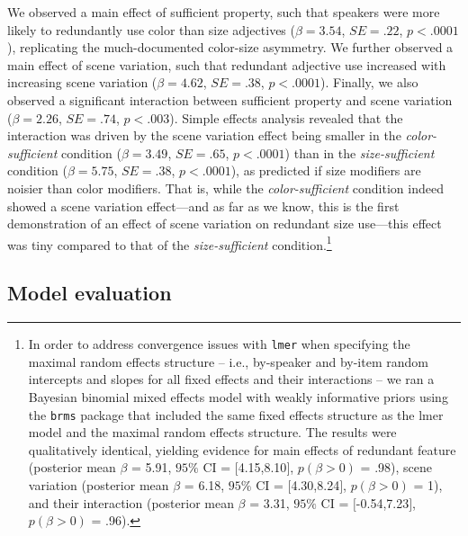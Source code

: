 \documentclass[11pt]{article}
\begin{document}
We observed a main effect of sufficient property, such that speakers were more likely to redundantly use color than size adjectives ($\beta = 3.54$, $SE = .22$, $p < .0001$), replicating the much-documented color-size asymmetry. We further observed a main effect of scene variation, such that redundant adjective use increased with increasing scene variation ($\beta = 4.62$, $SE = .38$, $p < .0001$). Finally, we also observed a significant interaction between sufficient property and scene variation ($\beta = 2.26$, $SE = .74$, $p < .003$). Simple effects analysis revealed that the interaction was driven by the scene variation effect being smaller in the \emph{color-sufficient} condition ($\beta = 3.49$, $SE = .65$, $p < .0001$) than in the \emph{size-sufficient} condition ($\beta = 5.75$, $SE = .38$, $p < .0001$), as predicted if size modifiers are noisier than color modifiers. That is, while the \emph{color-sufficient} condition indeed showed a scene variation effect---and as far as we know, this is the first demonstration of an effect of scene variation on redundant size use---this effect was tiny compared to that of the \emph{size-sufficient} condition.\footnote{In order to address convergence issues with \verb+lmer+ when specifying the maximal random effects structure -- i.e., by-speaker and by-item random intercepts and slopes for all fixed effects and their interactions -- we ran a Bayesian binomial mixed effects model with weakly informative priors using the \verb+brms+ package \cite{brms} that included the same fixed effects structure as the lmer model and the maximal random effects structure. The results were qualitatively identical, yielding  evidence for main effects of redundant feature (posterior mean $\beta$ = 5.91, $95\%$ CI = $[$4.15,8.10$]$, $p(\beta > 0)$ = .98), scene variation (posterior mean $\beta$ = 6.18, $95\%$ CI = $[$4.30,8.24$]$, $p(\beta > 0)$ = 1), and their interaction (posterior mean $\beta$ = 3.31, $95\%$ CI = $[$-0.54,7.23$]$, $p(\beta > 0)$ = .96).}


\subsection{Model evaluation}
\label{sec:modifiermodeleval}
\end{document}

